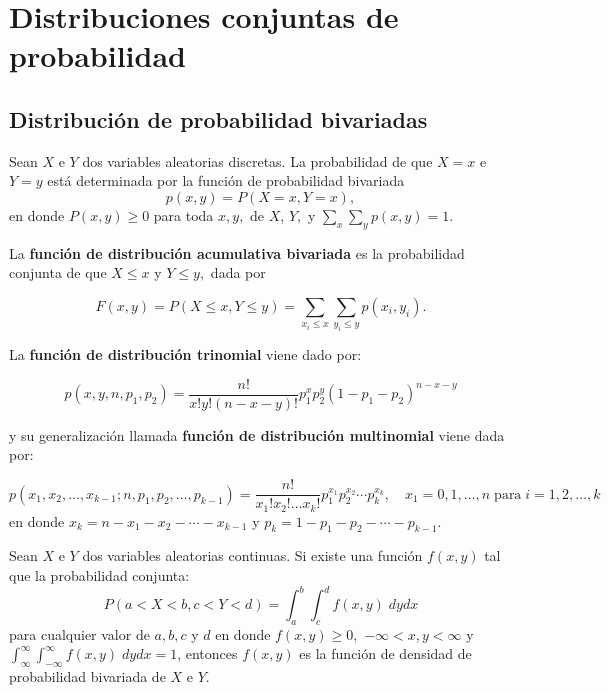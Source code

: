 \chapter{Distribuciones conjuntas de probabilidad}

\section{Distribución de probabilidad bivariadas}

\begin{tcolorbox}
    \begin{def.}
	Sean $X$ e $Y$ dos variables aleatorias discretas. La probabilidad de que $X=x$ e $Y=y$ está determinada por la función de probabilidad bivariada
	$$p(x,y)=P(X=x, Y=x),$$
	en donde $P(x,y)\geq 0$ para toda $x,y,$ de $X$, $Y,$ y $\sum_x \sum_y p(x,y)=1.$
    \end{def.}
\end{tcolorbox}

La \textbf{función de distribución acumulativa bivariada} es la probabilidad conjunta de que $X\leq x$ y $Y\leq y,$ dada por
\begin{tcolorbox}
    $$F(x,y)=P(X\leq x, Y\leq y) = \sum_{x_i\leq x}\sum_{y_i\leq y} p(x_i,y_i).$$
\end{tcolorbox}

La \textbf{función de distribución trinomial} viene dado por:

\begin{tcolorbox}
    $$p(x,y,n,p_1,p_2)=\dfrac{n!}{x!y!(n-x-y)!}p_1^x p_2^y (1-p_1-p_2)^{n-x-y}$$
\end{tcolorbox}
 
y su generalización llamada \textbf{función de distribución multinomial} viene dada por:

\begin{tcolorbox}
    $$p(x_1,x_2,\ldots, x_{k-1};n,p_1,p_2,\ldots,p_{k-1})=\dfrac{n!}{x_1!x_2!\ldots x_k!}p_1^{x_1}p_2^{x_2}\cdots p_k^{x_k}, \quad x_1=0,1,\ldots, n\; \mbox{para}\; i=1,2,\ldots, k$$
    en donde $x_k=n-x_1-x_2-\cdots - x_{k-1}$ y $p_k=1-p_1-p_2-\cdots - p_{k-1}.$
\end{tcolorbox}

\begin{tcolorbox}
    \begin{def.}
	Sean $X$ e $Y$ dos variables aleatorias continuas. Si existe una función $f(x,y)$ tal que la probabilidad conjunta:
	$$P(a<X<b,c<Y<d)=\int_a^b \int_c^d f(x,y)\; dy dx$$
	para cualquier valor de $a,b,c$ y $d$ en donde $f(x,y)\geq 0,$ $-\infty<x, y<\infty$ y $\int_{\infty}^\infty \int_{-\infty}^\infty f(x,y)\; dy dx=1$, entonces $f(x,y)$ es la función de densidad de probabilidad bivariada de $X$ e $Y$. 
    \end{def.}
\end{tcolorbox}

